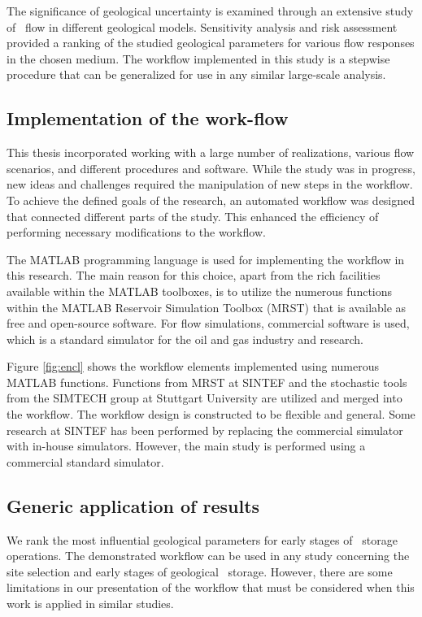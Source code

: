 The significance of geological uncertainty is examined through an extensive study of \coo\ flow in different geological models. Sensitivity analysis and risk assessment provided a ranking of the studied geological parameters for various flow responses in the chosen medium. The workflow implemented in this study is a stepwise procedure that can be generalized for use in any similar large-scale analysis.

\subsection{Implementation of the work-flow}
\label{sec:implementationWorkflow}
This thesis incorporated working with a large number of realizations, various flow scenarios, and different procedures and software. While the study was in progress, new ideas and challenges required the manipulation of new steps in the workflow. To achieve the defined goals of the research, an automated workflow was designed that connected different parts of the study. This enhanced the efficiency of performing necessary modifications to the workflow.

The MATLAB programming language is used for implementing the workflow in this research. The main reason for this choice, apart from the rich facilities available within the MATLAB toolboxes, is to utilize the numerous functions within the MATLAB Reservoir Simulation Toolbox (MRST) that is available as free and open-source software. For flow simulations, commercial software is used, which is a standard simulator for the oil and gas industry and research. 

Figure \ref{fig:encl} shows the workflow elements implemented using numerous MATLAB functions. Functions from MRST at SINTEF and the stochastic tools from the SIMTECH group at Stuttgart University are utilized and merged into the workflow. The workflow design is constructed to be flexible and general. Some research at SINTEF has been performed by replacing the commercial simulator with in-house simulators. However, the main study is performed using a commercial standard simulator.

\subsection{Generic application of results}
\label{genericApply}

We rank the most influential geological parameters for early stages of \coo\ storage operations. The demonstrated workflow can be used in any study concerning the site selection and early stages of geological \coo\ storage. However, there are some limitations in our presentation of the workflow that must be considered when this work is applied in similar studies.  

